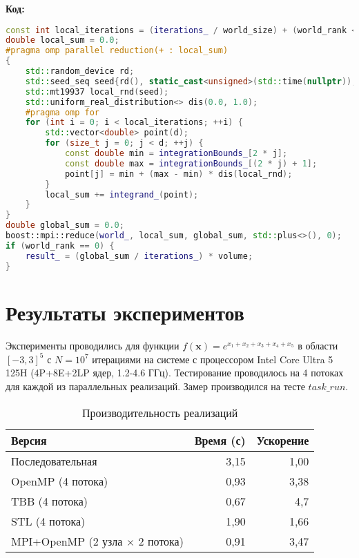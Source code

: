 \documentclass[12pt,a4paper]{extarticle}
\begin{document}
\textbf{Код:}
\begin{lstlisting}[language=C++]
const int local_iterations = (iterations_ / world_size) + (world_rank < (iterations_ % world_size) ? 1 : 0);
double local_sum = 0.0;
#pragma omp parallel reduction(+ : local_sum)
{
    std::random_device rd;
    std::seed_seq seed{rd(), static_cast<unsigned>(std::time(nullptr)), static_cast<unsigned>(world_rank), static_cast<unsigned>(omp_get_thread_num())};
    std::mt19937 local_rnd(seed);
    std::uniform_real_distribution<> dis(0.0, 1.0);
    #pragma omp for
    for (int i = 0; i < local_iterations; ++i) {
        std::vector<double> point(d);
        for (size_t j = 0; j < d; ++j) {
            const double min = integrationBounds_[2 * j];
            const double max = integrationBounds_[(2 * j) + 1];
            point[j] = min + (max - min) * dis(local_rnd);
        }
        local_sum += integrand_(point);
    }
}
double global_sum = 0.0;
boost::mpi::reduce(world_, local_sum, global_sum, std::plus<>(), 0);
if (world_rank == 0) {
    result_ = (global_sum / iterations_) * volume;
}
\end{lstlisting}

\newpage
\section{Результаты экспериментов}
Эксперименты проводились для функции \(f(\mathbf{x}) = e^{x_1 + x_2 + x_3 + x_4 + x_5}\) в области \([-3, 3]^5\) с \(N = 10^7\) итерациями на системе с процессором Intel Core Ultra 5 125H (4P+8E+2LP ядер, 1.2-4.6 ГГц). Тестирование проводилось на 4 потоках для каждой из параллельных реализаций. Замер производился на тесте $task\_run$.

\begin{table}[h]
\centering
\begin{tabular}{lrr}
\toprule
\textbf{Версия} & \textbf{Время (с)} & \textbf{Ускорение} \\
\midrule
Последовательная & 3,15 & 1,00 \\
OpenMP (4 потока) & 0,93 & 3,38 \\
TBB (4 потока) & 0,67 & 4,7 \\
STL (4 потока) & 1,90 & 1,66 \\
MPI+OpenMP (2 узла $\times$ 2 потока) & 0,91 & 3,47 \\
\bottomrule
\end{tabular}
\caption{Производительность реализаций}
\end{table}
\end{document}
